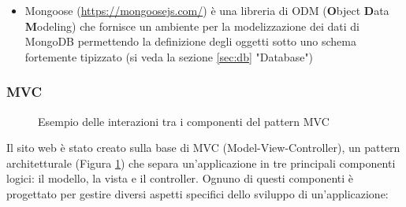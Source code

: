 \documentclass[12pt]{report}
\begin{document}
\begin{itemize}
\begin{lstlisting}[language=HTML]
<% for(var i=0; i<tessere.length; i++) { %>
	<tr class="w3-black tessere-table-mobile">
		<td><%= tessere[i].numero_tessera %></td>
		<td><%= tessere[i].seriale %></td>
		<td><%= dateFormat(tessere[i].rilasciato.toLocaleString("it-IT", { "year": "numeric", "month": "2-digit", "day": "2-digit" })) %></td>
		<td><%= dateFormat(tessere[i].ultimo_rinnovo.toLocaleString("it-IT", { "year": "numeric", "month": "2-digit", "day": "2-digit" })) %></td>
		<% if ( tessere[i].stato === "ATTIVATA" ) { %>
			<td>
				<div class="green-circle" style="margin: auto;"></div>
			</td>
		<% } else { %>
			<td>
				<div class="red-circle" style="margin: auto;"></div>
			</td>
		<% } %>
	</tr>
<% } %>
\end{lstlisting}
	\item Mongoose (\url{https://mongoosejs.com/}) è una libreria di ODM (\textbf{O}bject \textbf{D}ata \textbf{M}odeling) che fornisce un ambiente per la modelizzazione dei dati di MongoDB permettendo la definizione degli oggetti sotto uno schema fortemente tipizzato (si veda la sezione \ref{sec:db} "Database")	
\end{itemize}

\subsubsection*{MVC}

\begin{figure}
	\caption{Esempio delle interazioni tra i componenti del pattern MVC}
	\label{fig:mvc}
\end{figure}

Il sito web è stato creato sulla base di MVC (Model-View-Controller), un pattern architetturale (Figura \ref{fig:mvc}) che separa un'applicazione in tre principali componenti logici: il modello, la vista e il controller. Ognuno di questi componenti è progettato per gestire diversi aspetti specifici dello sviluppo di un'applicazione:
\end{document}
